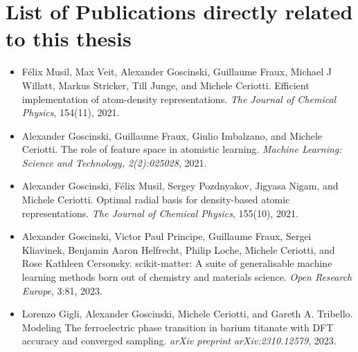 \section*{List of Publications directly related to this thesis}
\begin{itemize}
\item Félix Musil, Max Veit, Alexander Goscinski, Guillaume Fraux, Michael J Willatt, Markus Stricker, Till Junge, and Michele Ceriotti. Efficient implementation of atom-density representations. \textit{The Journal of Chemical Physics}, 154(11), 2021.
\item Alexander Goscinski, Guillaume Fraux, Giulio Imbalzano, and Michele Ceriotti. The role of feature space in atomistic learning. \textit{Machine Learning: Science and Technology, 2(2):025028}, 2021.
  \item Alexander Goscinski, Félix Musil, Sergey Pozdnyakov, Jigyasa Nigam, and Michele Ceriotti. Optimal radial basis for density-based atomic representations. \textit{The Journal of Chemical Physics}, 155(10), 2021.
  \item Alexander Goscinski, Victor Paul Principe, Guillaume Fraux, Sergei Kliavinek, Benjamin Aaron Helfrecht, Philip Loche, Michele Ceriotti, and Rose Kathleen Cersonsky. scikit-matter: A suite of generalisable machine learning methods born out of chemistry and materials science. \textit{Open Research Europe}, 3:81, 2023.
  \item Lorenzo Gigli, Alexander Goscinski, Michele Ceriotti, and Gareth A. Tribello. Modeling The ferroelectric phase transition in barium titanate with DFT accuracy and converged sampling. \textit{arXiv preprint arXiv:2310.12579}, 2023.

\end{itemize}

